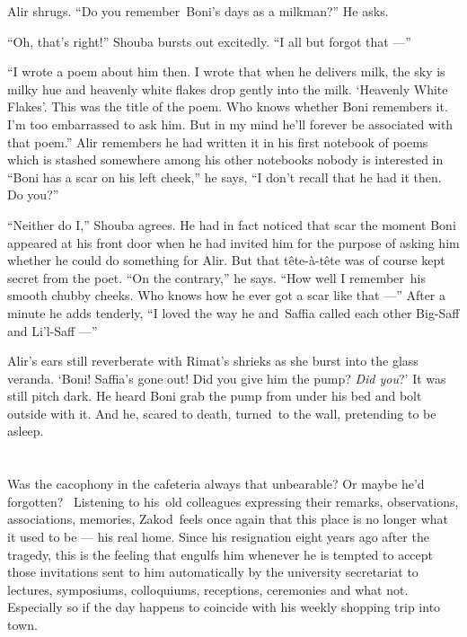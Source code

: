 \documentclass[twoside,11pt,openany]{book}
\begin{document}
Alir shrugs. ``Do you remember~Boni's days as a milkman?'' He asks.

``Oh, that's right!'' Shouba bursts out excitedly. ``I all but forgot that ---''

``I wrote a poem about him then. I wrote that when he delivers milk, the sky is milky hue and heavenly
white flakes drop gently into the milk. `Heavenly White Flakes'. This was the title of the poem. Who knows whether Boni
remembers it. I'm too embarrassed to ask him. But in my mind he'll forever be associated with that poem.''
Alir remembers he had written it in his first notebook of poems which is stashed somewhere among his other notebooks
nobody is interested in ``Boni has a scar on his left cheek,'' he says, ``I
don't recall that he had it then. Do you?''

``Neither do I,'' Shouba agrees.  He had in fact noticed that scar the moment Boni appeared
at his front door when he had invited him for the purpose of asking him whether he could do something for Alir. But
that t\^ete-\`a-t\^ete was of course kept secret from the poet. ``On the contrary,'' he says.
``How well I remember~his smooth chubby cheeks. Who knows how he ever got a scar like
that ---'' After a minute he adds tenderly, ``I loved the way he and~Saffia called each other
Big-Saff and Li'l-Saff ---''

Alir's ears still reverberate with Rimat's shrieks as she burst into the glass veranda.  `Boni! Saffia's gone
out! Did you give him the pump? \textit{Did you}?' It was still pitch dark. He heard Boni grab the pump from under his
bed and bolt outside with it. And he, scared to death, turned~to the wall, pretending to be asleep.



\chapter{}

Was the cacophony in the cafeteria always that unbearable? Or maybe he'd forgotten? ~Listening to his~old colleagues
expressing their remarks, observations, associations, memories, Zakod~feels once again that this place is no longer
what it used to be --- his real home. Since his resignation eight years ago after the tragedy, this is the feeling that
engulfs him whenever he is tempted to accept those invitations sent to him automatically by the university secretariat
to lectures, symposiums, colloquiums, receptions, ceremonies and what not. Especially so if the day happens
to coincide with his weekly shopping trip into town.
\end{document}
